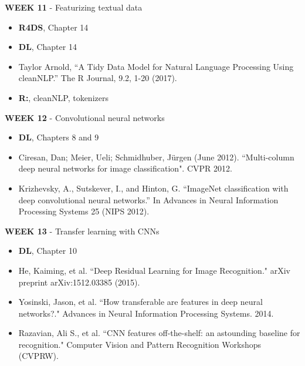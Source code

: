 \documentclass[12pt]{article}
\begin{document}
\vspace{0.2cm}

\textbf{WEEK 11} - Featurizing textual data

\begin{itemize}\setlength\itemsep{0em}
\item \textbf{R4DS}, Chapter 14
\item \textbf{DL}, Chapter 14
\item Taylor Arnold, ``A Tidy Data Model for Natural Language Processing
Using cleanNLP.'' The R Journal, 9.2, 1-20 (2017).
\item \textbf{R:}, cleanNLP, tokenizers
\end{itemize}

\vspace{0.2cm}

\textbf{WEEK 12} - Convolutional neural networks

\begin{itemize}\setlength\itemsep{0em}
\item \textbf{DL}, Chapters 8 and 9
\item Ciresan, Dan; Meier, Ueli; Schmidhuber, Jürgen (June 2012).
``Multi-column deep neural networks for image classification". CVPR 2012.
\item Krizhevsky, A., Sutskever, I., and Hinton, G.
``ImageNet classification with deep convolutional neural networks.''
In Advances in Neural Information Processing Systems 25 (NIPS 2012).
\end{itemize}

\vspace{0.2cm}

\textbf{WEEK 13} - Transfer learning with CNNs

\begin{itemize}\setlength\itemsep{0em}
\item \textbf{DL}, Chapter 10
\item He, Kaiming, et al. ``Deep Residual Learning for Image Recognition."
arXiv preprint arXiv:1512.03385 (2015).
\item Yosinski, Jason, et al. ``How transferable are features in deep neural
networks?." Advances in Neural Information Processing Systems. 2014.
\item Razavian, Ali S., et al. ``CNN features off-the-shelf: an astounding
baseline for recognition." Computer Vision and Pattern Recognition Workshops
(CVPRW).
\end{itemize}

\vspace{0.2cm}
\end{document}
